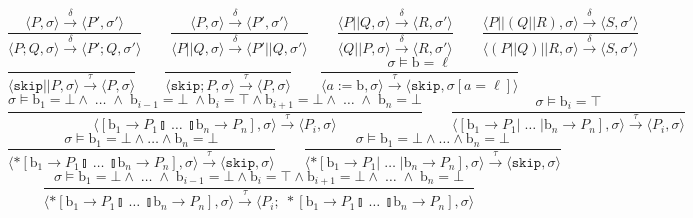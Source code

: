\documentclass[times, 10pt]{article}
\begin{document}
$$
    \frac{\langle P, \sigma \rangle \xrightarrow{\delta} \langle P', \sigma' \rangle}{\langle P ; Q, \sigma \rangle \xrightarrow{\delta} \langle P' ; Q, \sigma' \rangle} \qquad
    \frac{\langle P, \sigma \rangle \xrightarrow{\delta} \langle P', \sigma' \rangle}{\langle P || Q, \sigma \rangle \xrightarrow{\delta} \langle P' || Q, \sigma' \rangle} \qquad
    \frac{\langle P || Q, \sigma \rangle \xrightarrow{\delta} \langle R, \sigma' \rangle}{\langle Q || P, \sigma \rangle \xrightarrow{\delta} \langle R, \sigma' \rangle} \qquad
    \frac{\langle P || (Q || R), \sigma \rangle \xrightarrow{\delta} \langle S, \sigma' \rangle}{\langle (P || Q) || R, \sigma \rangle \xrightarrow{\delta} \langle S, \sigma' \rangle} $$$$
    \frac{}{\langle \mathtt{skip} || P, \sigma \rangle \xrightarrow{\tau} \langle P, \sigma \rangle} \qquad
    \frac{}{\langle \mathtt{skip}; P, \sigma \rangle \xrightarrow{\tau} \langle P, \sigma \rangle} \qquad
    \frac{\sigma \models \mathrm{b} = \ell}{\langle a := \mathrm{b}, \sigma \rangle \xrightarrow{\tau} \langle \mathtt{skip}, \sigma[a = \ell] \rangle} $$$$
    \frac{\sigma \models \mathrm{b}_1 = \bot \wedge \; \ldots \; \wedge \; \mathrm{b}_{i-1} = \bot \; \wedge \mathrm{b}_i = \top \wedge \mathrm{b}_{i+1} = \bot \wedge \; \ldots \; \wedge \; \mathrm{b}_n = \bot} {\langle [ \mathrm{b}_1 \rightarrow P_1  \talloblong \; \ldots \; \talloblong \mathrm{b}_n \rightarrow P_n ] , \sigma \rangle \xrightarrow{\tau} \langle P_i , \sigma\rangle  } \qquad
    \frac{\sigma \models \mathrm{b}_i = \top} {\langle [ \mathrm{b}_1 \rightarrow P_1  | \; \ldots \; | \mathrm{b}_n \rightarrow P_n ] , \sigma \rangle \xrightarrow{\tau} \langle P_i , \sigma\rangle  } $$$$
    \frac{\sigma \models \mathrm{b}_1 = \bot \wedge \ldots \wedge \mathrm{b}_n = \bot}{\langle *[ \mathrm{b}_1 \rightarrow P_1  \talloblong \; \ldots \; \talloblong \mathrm{b}_n \rightarrow P_n ] , \sigma \rangle \xrightarrow{\tau} \langle \mathtt{skip} , \sigma\rangle } \qquad
    \frac{\sigma \models \mathrm{b}_1 = \bot \wedge \ldots \wedge \mathrm{b}_n = \bot}{\langle *[ \mathrm{b}_1 \rightarrow P_1  | \; \ldots \; | \mathrm{b}_n \rightarrow P_n ] , \sigma \rangle \xrightarrow{\tau} \langle \mathtt{skip} , \sigma \rangle } $$$$
    \frac{\sigma \models \mathrm{b}_1 = \bot \wedge \; \ldots \; \wedge \; \mathrm{b}_{i-1} = \bot \wedge \mathrm{b}_i = \top \wedge \mathrm{b}_{i+1} = \bot \wedge \; \ldots \; \wedge \; \mathrm{b}_n = \bot} {\langle *[ \mathrm{b}_1 \rightarrow P_1  \talloblong \; \ldots \; \talloblong \mathrm{b}_n \rightarrow P_n ] , \sigma \rangle \xrightarrow{\tau} \langle P_i; \; *[ \mathrm{b}_1 \rightarrow P_1  \talloblong \; \ldots \; \talloblong \mathrm{b}_n \rightarrow P_n ] , \sigma\rangle  } $$$$
$$
\end{document}
